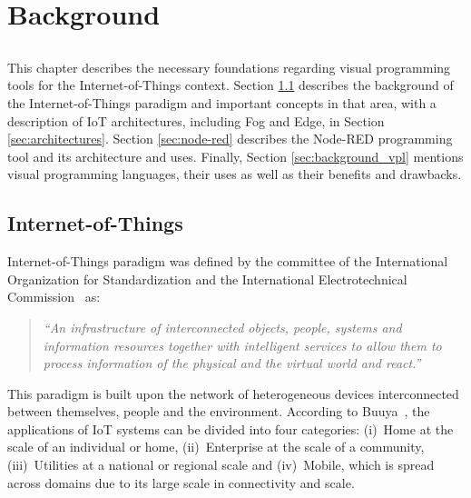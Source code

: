 \chapter{Background} \label{chap:background} \minitoc

\section*{}


This chapter describes the necessary foundations regarding visual programming tools for the Internet-of-Things context. Section \ref{sec:background_iot} describes the background of the Internet-of-Things paradigm and important concepts in that area, with a description of IoT architectures, including Fog and Edge, in Section \ref{sec:architectures}. Section \ref{sec:node-red} describes the Node-RED programming tool and its architecture and uses. Finally, Section \ref{sec:background_vpl} mentions visual programming languages, their uses as well as their benefits and drawbacks.

\section{Internet-of-Things}\label{sec:background_iot}

Internet-of-Things paradigm was defined by the committee of the International Organization for Standardization and the International Electrotechnical Commission~\cite{ISOIEC} as:
\begin{quote}
    \emph{“An infrastructure of interconnected objects, people, systems and information resources together with intelligent services to allow them to process information of the physical and the virtual world and react.”}
\end{quote}

This paradigm is built upon the network of heterogeneous devices interconnected between themselves, people and the environment. According to Buuya~\cite{iot_future_direction}, the applications of IoT systems can be divided into four categories: (i)~Home at the scale of an individual or home, (ii)~Enterprise at the scale of a community, (iii)~Utilities at a national or regional scale and (iv)~Mobile, which is spread across domains due to its large scale in connectivity and scale. 

